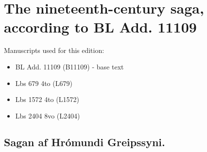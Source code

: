 \chapter*{The nineteenth-century saga, according to BL Add. 11109}
Manuscripts used for this edition: 
\begin{itemize}[noitemsep]
	\item BL Add. 11109 (B11109) - base text
	\item Lbs 679 4to (L679)
	\item Lbs 1572 4to (L1572)
	\item Lbs 2404 8vo (L2404)
\end{itemize}
\newpage
\beginnumbering \pstart {} 
\section*{Sagan af  Hrómundi Greipssyni.}
